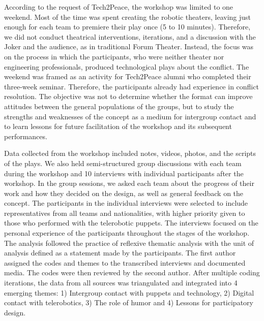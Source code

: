 \documentclass[dissertation,math,vertlayout,pdfa,colorlinks]{aaltoseries}
\begin{document}
According to the request of Tech2Peace, the workshop was limited to one weekend. Most of the time was spent creating the robotic theaters, leaving just enough for each team to premiere their play once (5 to 10 minutes). Therefore, we did not conduct theatrical interventions, iterations, and a discussion with the Joker and the audience, as in traditional Forum Theater. Instead, the focus was on the process in which the participants, who were neither theater nor engineering professionals, produced technological plays about the conflict. The weekend was framed as an activity for Tech2Peace alumni who completed their three-week seminar. Therefore, the participants already had experience in conflict resolution. The objective was not to determine whether the format can improve attitudes between the general populations of the groups, but to study the strengths and weaknesses of the concept as a medium for intergroup contact and to learn lessons for future facilitation of the workshop and its subsequent performances.

Data collected from the workshop included notes, videos, photos, and the scripts of the plays. We also held semi-structured group discussions with each team during the workshop and 10 interviews with individual participants after the workshop. In the group sessions, we asked each team about the progress of their work and how they decided on the design, as well as general feedback on the concept. The participants in the individual interviews were selected to include representatives from all teams and nationalities, with higher priority given to those who performed with the telerobotic puppets. The interviews focused on the personal experience of the participants throughout the stages of the workshop. The analysis followed the practice of reflexive thematic analysis \cite{braunUsingThematicAnalysis2006,braunReflectingReflexiveThematic2019} with the unit of analysis defined as a statement made by the participants. The first author assigned the codes and themes to the transcribed interviews and documented media. The codes were then reviewed by the second author. After multiple coding iterations, the data from all sources was triangulated \cite{guionTriangulationEstablishingValidity2011} and integrated into 4 emerging themes: 1) Intergroup contact with puppets and technology, 2) Digital contact with telerobotics, 3) The role of humor and 4) Lessons for participatory design.
\end{document}
